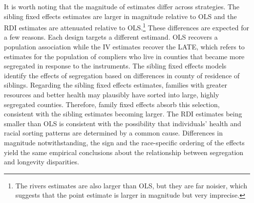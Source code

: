 \documentclass[11pt]{article}
\begin{document}
It is worth noting that the magnitude of estimates differ across strategies. The sibling fixed effects estimates are larger in magnitude relative to OLS and the RDI estimates are attenuated relative to OLS.\footnote{The rivers estimates are also larger than OLS, but they are far noisier, which suggests that the point estimate is larger in magnitude but very imprecise.} These differences are expected for a few reasons. Each design targets a different estimand. OLS recovers a population association while the IV estimates recover the LATE, which refers to estimates for the population of compliers who live in counties that became more segregated in response to the instruments. The sibling fixed effects models identify the effects of segregation based on differences in county of residence of siblings. Regarding the sibling fixed effects estimates, families with greater resources and better health may plausibly have sorted into large, highly segregated counties. Therefore, family fixed effects absorb this selection, consistent with the sibling estimates becoming larger. The RDI estimates being smaller than OLS is consistent with the possibility that individuals' health and racial sorting patterns are determined by a common cause. Differences in magnitude notwithstanding, the sign and the race-specific ordering of the effects yield the same empirical conclusions about the relationship between segregation and longevity disparities.
\end{document}
